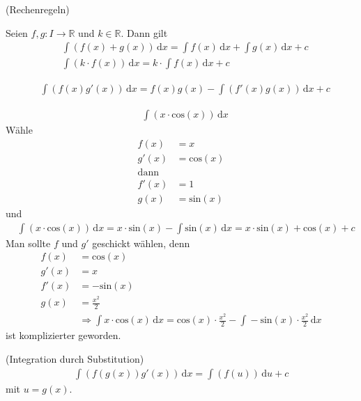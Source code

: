  (Rechenregeln)

Seien $f, g : I \rightarrow \mathbb{R}$ und $k \in \mathbb{R}$. Dann gilt
\begin{align*}
	&\int \! (f(x)+g(x)) \, \mathrm{d}x = \int \! f(x) \, \mathrm{d}x + \int \! g(x) \, \mathrm{d}x + c \\
	&\int \! (k \cdot f(x)) \, \mathrm{d}x = k \cdot \int \! f(x) \, \mathrm{d}x + c
\end{align*}

 
\begin{align*}
	&\int \! (f(x)g'(x)) \, \mathrm{d}x = f(x)g(x) - \int \! (f'(x)g(x)) \, \mathrm{d}x + c
\end{align*}

\begin{align*}
	&\int \! (x \cdot \text{cos}(x)) \, \mathrm{d}x
\end{align*}
Wähle
\begin{align*}
	f(x) &= x \\
	g'(x) &= \text{cos}(x) \\
	\text{dann} \\
	f'(x) &= 1 \\
	g(x) &= \text{sin}(x)
\end{align*}
und
\begin{align*}
	&\int \! (x \cdot \text{cos}(x)) \, \mathrm{d}x = x \cdot \text{sin}(x) - \int \! \text{sin}(x) \, \mathrm{d}x = x \cdot \text{sin}(x) + \text{cos}(x) + c
\end{align*}
Man sollte $f$ und $g'$ geschickt wählen, denn
\begin{align*}
	f(x) &= \text{cos}(x) \\
	g'(x) &= x \\
	f'(x) &= -\text{sin}(x) \\
	g(x) &= \frac{x^2}{2} \\
	&\Rightarrow \int \! x \cdot \text{cos}(x) \, \mathrm{d}x = \text{cos}(x) \cdot \frac{x^2}{2} - \int \! -\text{sin}(x) \cdot \frac{x^2}{2} \, \mathrm{d}x
\end{align*}
ist komplizierter geworden.

 (Integration durch Substitution)
\begin{align*}
	\int \! (f(g(x))g'(x)) \, \mathrm{d}x = \int \! (f(u)) \, \mathrm{d}u + c
\end{align*}
mit $u = g(x)$.

